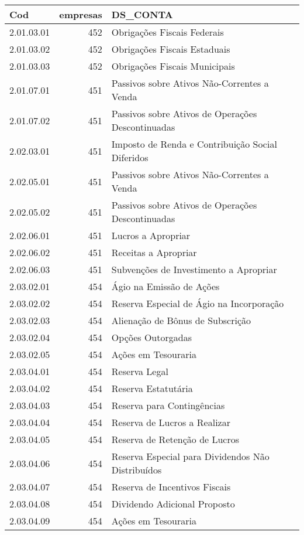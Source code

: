 \begin{table}[ht]
\centering
\begin{tabular}{lrl}
  \hline
Cod & empresas & DS\_CONTA \\ 
  \hline
2.01.03.01 & 452 & Obrigações Fiscais Federais \\ 
  2.01.03.02 & 452 & Obrigações Fiscais Estaduais \\ 
  2.01.03.03 & 452 & Obrigações Fiscais Municipais \\ 
  2.01.07.01 & 451 & Passivos sobre Ativos Não-Correntes a Venda \\ 
  2.01.07.02 & 451 & Passivos sobre Ativos de Operações Descontinuadas \\ 
  2.02.03.01 & 451 & Imposto de Renda e Contribuição Social Diferidos \\ 
  2.02.05.01 & 451 & Passivos sobre Ativos Não-Correntes a Venda \\ 
  2.02.05.02 & 451 & Passivos sobre Ativos de Operações Descontinuadas \\ 
  2.02.06.01 & 451 & Lucros a Apropriar \\ 
  2.02.06.02 & 451 & Receitas a Apropriar \\ 
  2.02.06.03 & 451 & Subvenções de Investimento a Apropriar \\ 
  2.03.02.01 & 454 & Ágio na Emissão de Ações \\ 
  2.03.02.02 & 454 & Reserva Especial de Ágio na Incorporação \\ 
  2.03.02.03 & 454 & Alienação de Bônus de Subscrição \\ 
  2.03.02.04 & 454 & Opções Outorgadas \\ 
  2.03.02.05 & 454 & Ações em Tesouraria \\ 
  2.03.04.01 & 454 & Reserva Legal \\ 
  2.03.04.02 & 454 & Reserva Estatutária \\ 
  2.03.04.03 & 454 & Reserva para Contingências \\ 
  2.03.04.04 & 454 & Reserva de Lucros a Realizar \\ 
  2.03.04.05 & 454 & Reserva de Retenção de Lucros \\ 
  2.03.04.06 & 454 & Reserva Especial para Dividendos Não Distribuídos \\ 
  2.03.04.07 & 454 & Reserva de Incentivos Fiscais \\ 
  2.03.04.08 & 454 & Dividendo Adicional Proposto \\ 
  2.03.04.09 & 454 & Ações em Tesouraria \\ 
   \hline
\end{tabular}
\end{table}
